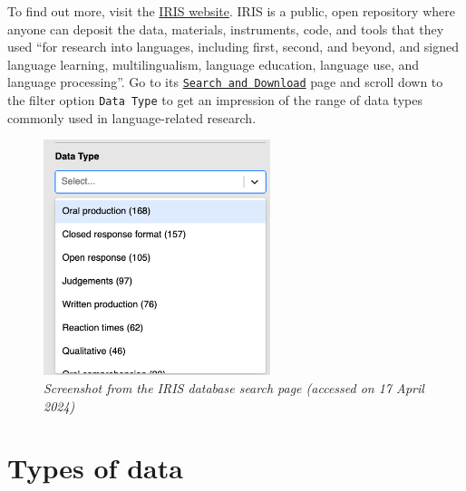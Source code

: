 \documentclass[
  letterpaper,
  DIV=11,
  numbers=noendperiod]{scrreprt}
\begin{document}
\begin{tcolorbox}[enhanced jigsaw, rightrule=.15mm, bottomrule=.15mm, coltitle=black, breakable, toprule=.15mm, colbacktitle=quarto-callout-caution-color!10!white, titlerule=0mm, colframe=quarto-callout-caution-color-frame, colback=white, arc=.35mm, left=2mm, opacitybacktitle=0.6, opacityback=0, bottomtitle=1mm, leftrule=.75mm, title=\textcolor{quarto-callout-caution-color}{\faFire}\hspace{0.5em}{Task 1}, toptitle=1mm]

To find out more, visit the \href{https://iris-database.org/}{IRIS
website}. IRIS is a public, open repository where anyone can deposit the
data, materials, instruments, code, and tools that they used ``for
research into languages, including first, second, and beyond, and signed
language learning, multilingualism, language education, language use,
and language processing''. Go to its
\href{https://iris-database.org/search}{\texttt{Search\ and\ Download}}
page and scroll down to the filter option \texttt{Data\ Type} to get an
impression of the range of data types commonly used in language-related
research.

\begin{figure}[H]

{\centering \includegraphics[width=2.60417in,height=\textheight]{images/IRISDataTypes.png}

}

\caption{\emph{Screenshot from the IRIS database search page (accessed
on 17 April 2024)}}

\end{figure}%

\end{tcolorbox}

\section{Types of data}\label{types-of-data}
\end{document}
